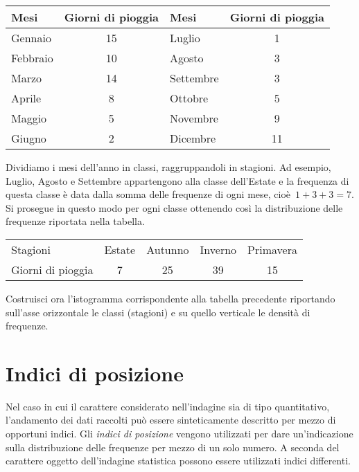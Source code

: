 \begin{exrig}
\begin{esempio}
\begin{center}
\begin{tabular}{lclc}
\toprule
Mesi & Giorni di pioggia &Mesi & Giorni di pioggia\\
\midrule
Gennaio & 15&Luglio & 1 \\
Febbraio & 10 &Agosto & 3\\
Marzo & 14 &Settembre & 3\\
Aprile & 8 &Ottobre & 5\\
Maggio & 5 &Novembre & 9\\
Giugno & 2 &Dicembre & 11\\
\bottomrule
\end{tabular}
\end{center}
Dividiamo i mesi dell'anno in classi, raggruppandoli in stagioni. Ad esempio, Luglio, Agosto e Settembre
appartengono alla classe dell'Estate e la frequenza di questa classe è data dalla somma delle frequenze di ogni mese, cioè~$1 + 3 + 3 = 7$. Si prosegue in questo modo per ogni classe ottenendo così la distribuzione delle frequenze riportata nella tabella.
\begin{center}
\begin{tabular}{lcccc}
\toprule
Stagioni & Estate & Autunno & Inverno& Primavera\\
Giorni di pioggia & 7 & 25 & 39 & 15 \\
\bottomrule
\end{tabular}
\end{center}
Costruisci ora l'istogramma corrispondente alla tabella precedente riportando sull'asse orizzontale le classi (stagioni) e su quello verticale le densità di frequenze.
 \end{esempio}
\end{exrig}

\ovalbox{\risolvii \ref{ese:A.10}, \ref{ese:A.11}, \ref{ese:A.12}, \ref{ese:A.13}, \ref{ese:A.14}, \ref{ese:A.15}, \ref{ese:A.16}, \ref{ese:A.17}, \ref{ese:A.18}, \ref{ese:A.19}, \ref{ese:A.20}}

\section{Indici di posizione}

Nel caso in cui il carattere considerato nell'indagine sia di tipo quantitativo, l'andamento dei dati raccolti può essere sinteticamente descritto per mezzo di opportuni indici. Gli \emph{indici di posizione} vengono utilizzati per dare un'indicazione sulla distribuzione delle frequenze per mezzo di un solo numero.
A seconda del carattere oggetto dell'indagine statistica possono essere utilizzati indici differenti.

